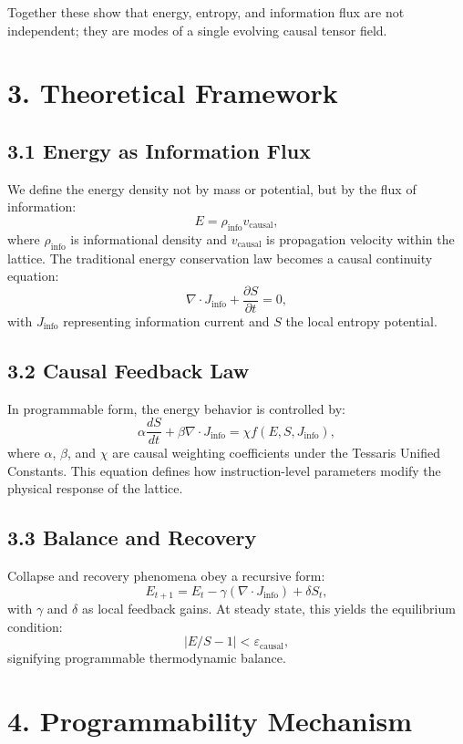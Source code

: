 \documentclass[11pt,a4paper]{article}
\begin{document}
Together these show that energy, entropy, and information flux are not independent; they are modes of a single evolving causal tensor field.

\section{3. Theoretical Framework}

\subsection*{3.1 Energy as Information Flux}
We define the energy density not by mass or potential, but by the flux of information:
\[
E = \rho_{\text{info}} v_{\text{causal}},
\]
where $\rho_{\text{info}}$ is informational density and $v_{\text{causal}}$ is propagation velocity within the lattice.  
The traditional energy conservation law becomes a causal continuity equation:
\[
\nabla \!\cdot\! J_{\text{info}} + \frac{\partial S}{\partial t} = 0,
\]
with $J_{\text{info}}$ representing information current and $S$ the local entropy potential.

\subsection*{3.2 Causal Feedback Law}
In programmable form, the energy behavior is controlled by:
\[
\alpha \frac{dS}{dt} + \beta \nabla\!\cdot\!J_{\text{info}} = \chi f(E,S,J_{\text{info}}),
\]
where $\alpha$, $\beta$, and $\chi$ are causal weighting coefficients under the Tessaris Unified Constants.  
This equation defines how instruction-level parameters modify the physical response of the lattice.

\subsection*{3.3 Balance and Recovery}
Collapse and recovery phenomena obey a recursive form:
\[
E_{t+1} = E_t - \gamma (\nabla\!\cdot\!J_{\text{info}}) + \delta S_t,
\]
with $\gamma$ and $\delta$ as local feedback gains.  
At steady state, this yields the equilibrium condition:
\[
|E/S - 1| < \varepsilon_{\text{causal}},
\]
signifying programmable thermodynamic balance.

\section{4. Programmability Mechanism}
\end{document}
